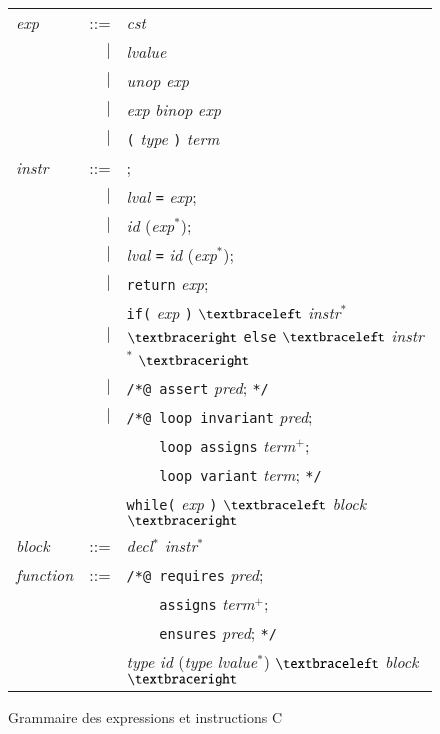 \begin{figure}[tb]
  \begin{tabular}{lrl}
    \textit{exp} & ::= & \textit{cst} \\
    & $\mid$ & \textit{lvalue} \\
    & $\mid$ & \textit{unop} \textit{exp} \\
    & $\mid$ & \textit{exp} \textit{binop} \textit{exp} \\
    & $\mid$ & \lstinline'(' \textit{type} \lstinline')' \textit{term} \\
    \textit{instr} & ::= & ; \\
    & $\mid$ & \textit{lval} \lstinline'=' \textit{exp}; \\
    & $\mid$ & \textit{id} (\textit{exp}$^{*}$); \\
    & $\mid$ & \textit{lval} \lstinline'=' \textit{id} (\textit{exp}$^{*}$); \\
    & $\mid$ & \lstinline'return' \textit{exp}; \\
    & $\mid$ & \lstinline'if(' \textit{exp} \lstinline')'
    $\bopen$ \textit{instr}$^*$ $\bclose$
    \lstinline'else' $\bopen$ \textit{instr}$^*$ $\bclose$ \\
    & $\mid$ & \lstinline'/*@ assert' \textit{pred}; \lstinline'*/' \\
    & $\mid$ & \lstinline'/*@ loop invariant' \textit{pred}; \\
    &        & \lstinline'    loop assigns' \textit{term}$^{+}$; \\
    &        & \lstinline'    loop variant' \textit{term}; \lstinline'*/' \\
    &        & \lstinline'while(' \textit{exp} \lstinline')'
    $\bopen$ \textit{block} $\bclose$ \\
    \textit{block} & ::= & \textit{decl}$^{*}$ \textit{instr}$^{*}$ \\
    \textit{function} & ::= & \lstinline'/*@ requires' \textit{pred}; \\
                      &     & \lstinline'    assigns' \textit{term}$^{+}$; \\
                      &     & \lstinline'    ensures' \textit{pred};
    \lstinline'*/'\\
                      &     & \textit{type} \textit{id}
    (\textit{type} \textit{lvalue}$^{*}$) $\bopen$ \textit{block} $\bclose$ \\
  \end{tabular}
  \caption{Grammaire des expressions et instructions C}
  \label{fig:gram-c}
\end{figure}


